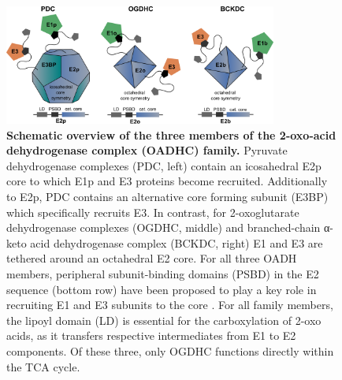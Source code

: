 \documentclass[times, twoside]{zHenriquesLab-StyleBioRxiv}
\begin{document}
\begin{figure}[ht]
    \centering
    \includegraphics[width=0.8\textwidth]{Figure1.png}
    \caption{\textbf{Schematic overview of the three members of the 2-oxo-acid dehydrogenase complex (OADHC) family.} Pyruvate dehydrogenase complexes (PDC, left) contain an icosahedral E2p core to which E1p and E3 proteins become recruited. Additionally to E2p, PDC contains an alternative core forming subunit (E3BP) which specifically recruits E3. In contrast, for 2-oxoglutarate dehydrogenase complexes (OGDHC, middle) and branched-chain α-keto acid dehydrogenase complex (BCKDC, right) E1 and E3 are tethered around an octahedral E2 core. For all three OADH members, peripheral subunit-binding domains (PSBD) in the E2 sequence (bottom row) have been proposed to play a key role in recruiting E1 and E3 subunits to the core \cite{Perham_2000}. For all family members, the lipoyl domain (LD) is essential for the carboxylation of 2-oxo acids, as it transfers respective intermediates from E1 to E2 components. Of these three, only OGDHC functions directly within the TCA cycle.}
    \label{}
\end{figure}
\end{document}
